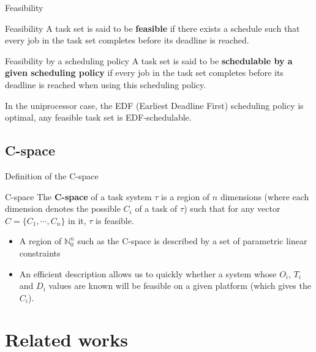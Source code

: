 \documentclass{beamer}
\begin{document}
	\begin{frame}{Feasibility}
		\begin{block}{Feasibility}
        A task set is said to be \textbf{feasible} if there exists a schedule such that every job in the task set completes before its deadline is reached.
        \end{block}

        \begin{block}{Feasibility by a scheduling policy}
        A task set is said to be \textbf{schedulable by a given scheduling policy} if every job in the task set completes before its deadline is reached when using this scheduling policy.
        \end{block}

        In the uniprocessor case, the EDF (Earliest Deadline First) scheduling policy is optimal, any feasible task set is EDF-schedulable.
	\end{frame}

    \subsection{C-space}

    \begin{frame}{Definition of the C-space}
        \begin{block}{C-space}
            The \textbf{C-space} of a task system $\tau$ is a region of $n$ dimensions (where each dimension denotes the possible $C_i$ of a task of $\tau$) such that for any vector $C = \{ C_1, \cdots, C_{n}\}$ in it, $\tau$ is feasible.
        \end{block}

        \begin{itemize}
            \item A region of $\mathbb{N}_0^n$ such as the C-space is described by a set of parametric linear constraints
            \item An efficient description allows us to quickly  whether a system whose $O_i$, $T_i$ and $D_i$ values are known will be feasible on a given platform (which gives the $C_i$).
        \end{itemize}

    \end{frame}

	\section{Related works}
\end{document}
